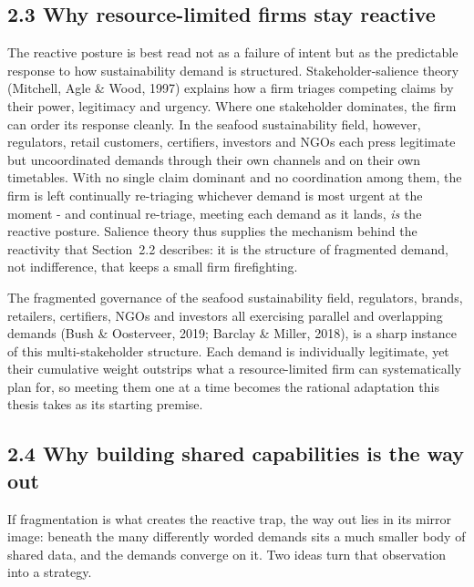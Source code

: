 \documentclass[
]{article}
\begin{document}
\subsection{2.3 Why resource-limited firms stay
reactive}\label{stakeholder-pressure-and-fragmented-governance}

The reactive posture is best read not as a failure of intent but as the predictable
response to how sustainability demand is structured. Stakeholder-salience theory
(Mitchell, Agle \& Wood, 1997) explains how a firm triages competing claims by
their power, legitimacy and urgency. Where one stakeholder dominates, the firm can
order its response cleanly. In the seafood sustainability field, however,
regulators, retail customers, certifiers, investors and NGOs each press legitimate
but uncoordinated demands through their own channels and on their own timetables.
With no single claim dominant and no coordination among them, the firm is left
continually re-triaging whichever demand is most urgent at the moment - and
continual re-triage, meeting each demand as it lands, \emph{is} the reactive
posture. Salience theory thus supplies the mechanism behind the reactivity that
Section~2.2 describes: it is the structure of fragmented demand, not indifference,
that keeps a small firm firefighting.

The fragmented governance of the seafood sustainability field, regulators,
brands, retailers, certifiers, NGOs and investors all exercising parallel and
overlapping demands (Bush \& Oosterveer, 2019; Barclay \& Miller, 2018), is a
sharp instance of this multi-stakeholder structure. Each demand is individually
legitimate, yet their cumulative weight outstrips what a resource-limited firm can
systematically plan for, so meeting them one at a time becomes the rational
adaptation this thesis takes as its starting premise.

\subsection{2.4 Why building shared capabilities is the way
out}\label{the-bridge-cross-stakeholder-demand-convergence}

If fragmentation is what creates the reactive trap, the way out lies in its mirror
image: beneath the many differently worded demands sits a much smaller body of
shared data, and the demands converge on it. Two ideas turn that observation into a
strategy.
\end{document}
